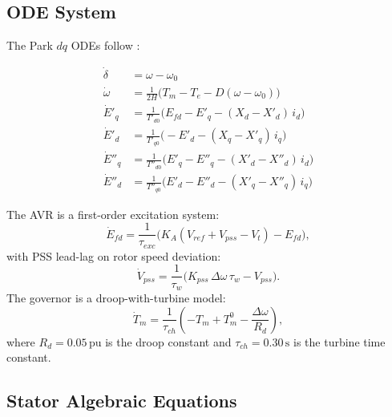 \documentclass[12pt,a4paper]{article}
\theoremstyle{definition}
\theoremstyle{plain}
\begin{document}
\subsection{ODE System}
\label{sec:model:ode}

The Park $dq$ ODEs follow \citet{Kundur1994}:

\begin{align}
  \dot{\delta} &= \omega - \omega_0
                  \label{eq:ode:delta}\\
  \dot{\omega} &= \frac{1}{2H}\bigl(T_m - T_e - D(\omega - \omega_0)\bigr)
                  \label{eq:ode:omega}\\
  \dot{E}'_q   &= \frac{1}{T'_{d0}}\bigl(E_{fd} - E'_q
                  - (X_d - X'_d)\,i_d\bigr)
                  \label{eq:ode:Epq}\\
  \dot{E}'_d   &= \frac{1}{T'_{q0}}\bigl(-E'_d
                  - (X_q - X'_q)\,i_q\bigr)
                  \label{eq:ode:Epd}\\
  \dot{E}''_q  &= \frac{1}{T''_{d0}}\bigl(E'_q - E''_q
                  - (X'_d - X''_d)\,i_d\bigr)
                  \label{eq:ode:Eppq}\\
  \dot{E}''_d  &= \frac{1}{T''_{q0}}\bigl(E'_d - E''_d
                  - (X'_q - X''_q)\,i_q\bigr)
                  \label{eq:ode:Eppd}
\end{align}

The AVR is a first-order excitation system:
\begin{equation}
  \dot{E}_{fd} = \frac{1}{\tau_{exc}}
    \bigl(K_A(V_{ref} + V_{pss} - V_t) - E_{fd}\bigr),
  \label{eq:ode:avr}
\end{equation}
with PSS lead-lag on rotor speed deviation:
\begin{equation}
  \dot{V}_{pss} = \frac{1}{\tau_w}
    \bigl(K_{pss}\,\Delta\omega\,\tau_w - V_{pss}\bigr).
  \label{eq:ode:pss}
\end{equation}
The governor is a droop-with-turbine model:
\begin{equation}
  \dot{T}_m = \frac{1}{\tau_{ch}}
    \left(-T_m + T_m^0 - \frac{\Delta\omega}{R_d}\right),
  \label{eq:ode:gov}
\end{equation}
where $R_d = 0.05\,\text{pu}$ is the droop constant and
$\tau_{ch} = 0.30\,\text{s}$ is the turbine time constant.

\subsection{Stator Algebraic Equations}
\label{sec:model:algebraic}
\end{document}
